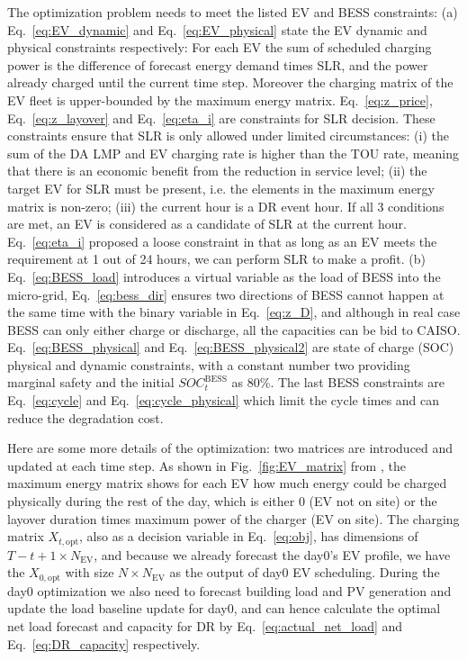 \documentclass[conference]{IEEEtran}
\begin{document}
The optimization problem needs to meet the listed EV and BESS constraints: (a) Eq.~\ref{eq:EV_dynamic} and Eq.~\ref{eq:EV_physical} state the EV dynamic and physical constraints respectively: For each EV the sum of scheduled charging power is the difference of forecast energy demand times SLR, and the power already charged until the current time step. Moreover the charging matrix of the EV fleet is upper-bounded by the maximum energy matrix. Eq.~\ref{eq:z_price}, Eq.~\ref{eq:z_layover} and Eq.~\ref{eq:eta_i} are constraints for SLR decision. These constraints ensure that SLR is only allowed under limited circumstances: (i) the sum of the DA LMP and EV charging rate is higher than the TOU rate, meaning that there is an economic benefit from the reduction in service level; (ii) the target EV for SLR must be present, i.e. the elements in the maximum energy matrix is non-zero; (iii) the current hour is a DR event hour. If all 3 conditions are met, an EV is considered as a candidate of SLR at the current hour. Eq.~\ref{eq:eta_i} proposed a loose constraint in that as long as an EV meets the requirement at 1 out of 24 hours, we can perform SLR to make a profit. (b) Eq.~\ref{eq:BESS_load} introduces a virtual variable as the load of BESS into the micro-grid, Eq.~\ref{eq:bess_dir} ensures two directions of BESS cannot happen at the same time with the binary variable in Eq.~\ref{eq:z_D}, and although in real case BESS can only either charge or discharge, all the capacities can be bid to CAISO. Eq.~\ref{eq:BESS_physical} and Eq.~\ref{eq:BESS_physical2} are state of charge (SOC) physical and dynamic constraints, with a constant number two providing marginal safety and the initial $SOC_t^{\text{BESS}}$ as 80\%. The last BESS constraints are Eq.~\ref{eq:cycle} and Eq.~\ref{eq:cycle_physical} which limit the cycle times and can reduce the degradation cost.



Here are some more details of the optimization: two matrices are introduced and updated at each time step. As shown in Fig.~\ref{fig:EV_matrix} from \cite{chen2024cost}, the maximum energy matrix shows for each EV how much energy could be charged physically during the rest of the day, which is either 0 (EV not on site) or the layover duration times maximum power of the charger (EV on site). The charging matrix $X_{t,\text{opt}}$, also as a decision variable in Eq.~\ref{eq:obj}, has dimensions of $T-t+1 \times N_{\text{EV}}$, and because we already forecast the day0's EV profile, we have the $X_{0,\text{opt}}$ with size $N \times N_{\text{EV}}$ as the output of day0 EV scheduling. During the day0 optimization we also need to forecast building load and PV generation and update the load baseline update for day0, and can hence calculate the optimal net load forecast and capacity for DR by Eq.~\ref{eq:actual_net_load} and Eq.~\ref{eq:DR_capacity} respectively.
\end{document}
